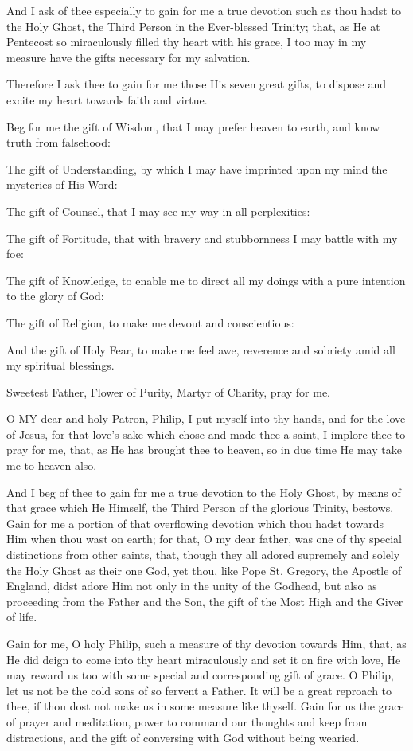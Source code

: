 And I ask of thee especially to gain for me a true
devotion such as thou hadst to the Holy Ghost, the Third Person in the
Ever-blessed Trinity; that, as He at Pentecost so miraculously filled
thy heart with his grace, I too may in my measure have the gifts
necessary for my salvation.

Therefore I ask thee to gain for me those His seven
great gifts, to dispose and excite my heart towards faith and virtue.

Beg for me the gift of Wisdom, that I may prefer
heaven to earth, and know truth from falsehood:

The gift of Understanding, by which I may have
imprinted upon my mind the mysteries of His Word:

The gift of Counsel, that I may see my way in all
perplexities:

The gift of Fortitude, that with bravery and
stubbornness I may battle with my foe:

The gift of Knowledge, to enable me to direct all
my doings with a pure intention to the glory of God:

The gift of Religion, to make me devout and
conscientious:

And the gift of Holy Fear, to make me feel awe,
reverence and sobriety amid all my spiritual blessings.

Sweetest Father, Flower of Purity, Martyr of
Charity, pray for me.


O MY dear and
holy Patron, Philip, I put myself into thy hands, and for the love of
Jesus, for that love’s sake which chose and made thee a saint, I
implore thee to pray for me, that, as He has brought thee to heaven, so
in due time He may take me to heaven also.

And I beg of thee to gain for me a true devotion to
the Holy Ghost, by means of that grace which He Himself, the Third
Person of the glorious Trinity, bestows. Gain for me a portion of that
overflowing devotion which thou hadst towards Him when thou wast on
earth; for that, O my dear father, was one of thy special distinctions
from other saints, that, though they all adored supremely and solely the
Holy Ghost as their one God, yet thou, like Pope St. Gregory, the
Apostle of England, didst adore Him not only in the unity of the
Godhead, but also as proceeding from the Father and the Son, the gift of
the Most High and the Giver of life.

Gain for me, O holy Philip, such a measure of thy
devotion towards Him, that, as He did deign to come into thy heart
miraculously and set it on fire with love, He may reward us too with
some special and corresponding gift of grace. O Philip, let us not be the cold sons of so fervent a Father. It will be a great reproach to
thee, if thou dost not make us in some measure like thyself. Gain for us
the grace of prayer and meditation, power to command our thoughts and
keep from distractions, and the gift of conversing with God without
being wearied.

